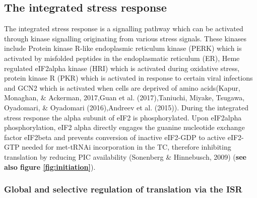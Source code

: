 \documentclass[12pt,openany]{book}
\begin{document}
\clearpage
\subsection{The integrated stress response} The integrated stress
response is a signalling pathway which can be activated through kinase
signalling originating from various stress signals. These kinases
include Protein kinase R-like endoplasmic reticulum kinase (PERK) which
is activated by misfolded peptides in the endoplasmatic reticulum (ER),
Heme regulated eIF2alpha kinase (HRI) which is activated during
oxidative stress, protein kinase R (PKR) which is activated in response
to certain viral infections and GCN2 which is activated when cells are
deprived of amino acids(Kapur, Monaghan, \& Ackerman, 2017,Guan et al.
(2017),Taniuchi, Miyake, Tsugawa, Oyadomari, \& Oyadomari (2016),Andreev
et al. (2015)). During the integrated stress response the alpha subunit
of eIF2 is phosphorylated. Upon eIF2alpha phosphorylation, eIF2 alpha
directly engages the guanine nucleotide exchange factor eIF2beta and
prevents conversion of inactive eIF2-GDP to active eIF2-GTP needed for
met-tRNAi incorporation in the TC, therefore inhibiting translation by
reducing PIC availability (Sonenberg \& Hinnebusch, 2009) (\textbf{see
also figure \ref{fig:initiation}}).

\subsubsection{Global and selective regulation of translation via the ISR}
\end{document}
